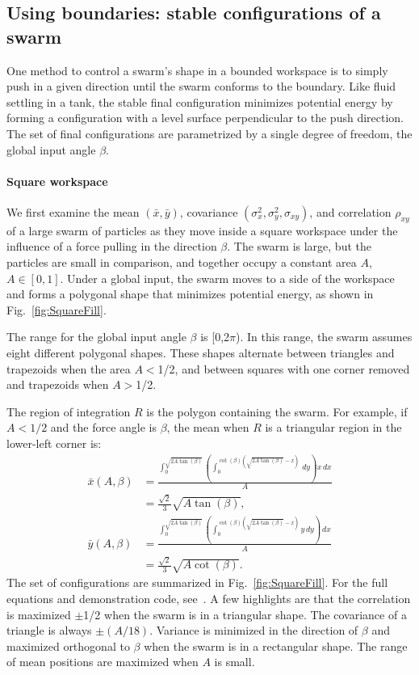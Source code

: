 \subsection{Using boundaries: stable configurations of a swarm}\label{subsec:FluidInTank}
One method to control a swarm's shape in a bounded workspace is to simply push in a given direction until the swarm conforms to the boundary. Like fluid settling in a tank, the stable final configuration minimizes potential energy by forming a configuration with a level surface perpendicular to the push direction. The set of final configurations are parametrized by a single degree of freedom, the global input angle $\beta$.
\paragraph{Square workspace}
We first examine the mean $(\bar{x},\bar{y})$, covariance $(\sigma^2_x,\sigma^2_y,\sigma_{xy})$, and correlation $\rho_{xy}$ of a large swarm of particles as they move inside a square workspace under the influence of a force pulling in the direction $\beta$. The swarm is large, but the particles are small in comparison, and together occupy a constant area $A$, $A\in [0,1]$. Under a global input, the swarm moves to a side of the workspace and forms a polygonal shape that minimizes potential energy, as shown in Fig.~\ref{fig:SquareFill}. %

The range for the global input angle $\beta $ is [0,2$\pi $). In this range, the swarm assumes eight different polygonal shapes. 
These shapes alternate between triangles and trapezoids when the area $A$$<$1/2, and between squares with one corner removed and trapezoids when $A$$>$1/2.


The region of integration $R$ is the polygon containing the swarm. For example, if $A<1/2$ and the force angle is $\beta$, the mean when $R$ is a triangular region in the lower-left corner is:
\begin{align}\label{eq:meanInSquareWorkspaceLL}
\bar{x}(A,\beta) &= \frac{\int_0^{\sqrt{2 A \tan (\beta)}} \left(\int_0^{\cot (\beta) \left(\sqrt{2 A \tan (\beta)}-x\right)} \, dy\right) x \, dx}{A} \nonumber \\
	&=\frac{ \sqrt{2}}{3} \sqrt{A \tan (\beta )},\\
\bar{y}(A,\beta) &= \frac{\int_0^{\sqrt{2 A \tan (\beta)}} \left(\int_0^{\cot (\beta) \left(\sqrt{2 A \tan (\beta)}-x\right)} y \, dy\right) \, dx}{A} \nonumber\\
	&=\frac{\sqrt{2}}{3}  \sqrt{A \cot (\beta )}.
\end{align}
The set of configurations are summarized in Fig.~\ref{fig:SquareFill}. For the full equations and demonstration code, see~\cite{Haoran2016SwarminSquare}. A few highlights are that the correlation is maximized $\pm$1/2 when the swarm is in a triangular shape. The covariance of a triangle is always $\pm(A/18)$. Variance is minimized in the direction of $\beta$ and maximized orthogonal to $\beta$ when the swarm is in a rectangular shape. The range of mean positions are maximized when $A$ is small.

